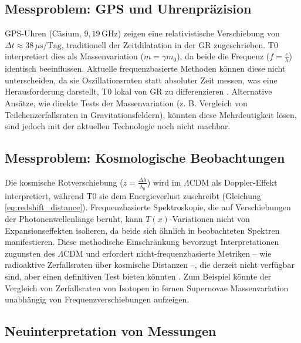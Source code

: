 \documentclass[12pt,a4paper]{article}
\newcommand{\Tfield}{T(x)}
\begin{document}
	\subsection{Messproblem: GPS und Uhrenpräzision}
	\label{subsec:gps_clock_problem}
	
	GPS-Uhren (Cäsium, \(9,19 \, \text{GHz}\)) zeigen eine relativistische Verschiebung von \(\Delta t \approx 38 \, \mu\text{s/Tag}\), traditionell der Zeitdilatation in der GR zugeschrieben. T0 interpretiert dies als Massenvariation (\(m = \gamma m_0\)), da beide die Frequenz (\(f = \frac{c}{\lambda}\)) identisch beeinflussen. Aktuelle frequenzbasierte Methoden können diese nicht unterscheiden, da sie Oszillationsraten statt absoluter Zeit messen, was eine Herausforderung darstellt, T0 lokal von GR zu differenzieren \cite{pascher_quantum_2025}. Alternative Ansätze, wie direkte Tests der Massenvariation (z. B. Vergleich von Teilchenzerfallsraten in Gravitationsfeldern), könnten diese Mehrdeutigkeit lösen, sind jedoch mit der aktuellen Technologie noch nicht machbar.
	
	\subsection{Messproblem: Kosmologische Beobachtungen}
	\label{subsec:cosmological_measurement_problem}
	
	Die kosmische Rotverschiebung (\(z = \frac{\Delta \lambda}{\lambda_0}\)) wird im \(\Lambda\)CDM als Doppler-Effekt interpretiert, während T0 sie dem Energieverlust zuschreibt (Gleichung \ref{eq:redshift_distance}). Frequenzbasierte Spektroskopie, die auf Verschiebungen der Photonenwellenlänge beruht, kann \(\Tfield\)-Variationen nicht von Expansionseffekten isolieren, da beide sich ähnlich in beobachteten Spektren manifestieren. Diese methodische Einschränkung bevorzugt Interpretationen zugunsten des \(\Lambda\)CDM und erfordert nicht-frequenzbasierte Metriken – wie radioaktive Zerfallsraten über kosmische Distanzen –, die derzeit nicht verfügbar sind, aber einen definitiven Test bieten könnten \cite{pascher_alphabeta_2025}. Zum Beispiel könnte der Vergleich von Zerfallsraten von Isotopen in fernen Supernovae Massenvariation unabhängig von Frequenzverschiebungen aufzeigen.
	
	\subsection{Neuinterpretation von Messungen}
	\label{subsec:reassessment_measurements}
	
\end{document}
